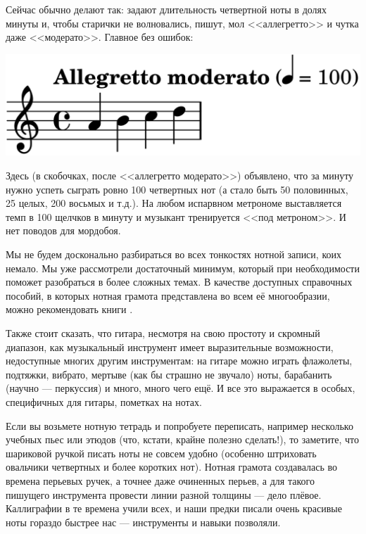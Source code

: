 Сейчас обычно делают так: задают длительность четвертной ноты в долях минуты и, чтобы старички не волновались, пишут, мол <<аллегретто>> и чутка даже <<модерато>>. Главное без ошибок:
\begin{center}
    \includegraphics{fig/notes/tempo}
\end{center}

Здесь (в скобочках, после <<аллегретто модерато>>) объявлено, что за минуту нужно успеть сыграть ровно 100 четвертных нот (а стало быть 50 половинных, 25 целых, 200 восьмых и т.д.). На любом испарвном метрономе выставляется темп в 100 щелчков в минуту и музыкант тренируется <<под метроном>>. И нет поводов для мордобоя. 

Мы не будем досконально разбираться во всех тонкостях нотной записи, коих немало. Мы уже рассмотрели достаточный минимум, который при необходимости поможет разобраться в более сложных темах. В качестве доступных справочных пособий, в которых нотная грамота представлена во всем её многообразии, можно рекомендовать книги \cite{bib:alekseev:MusicTheory,bib:vahromeev:Theory}.

Также стоит сказать, что гитара, несмотря на свою простоту и скромный диапазон, как музыкальный инструмент имеет выразительные возможности, недоступные многих другим инструментам: на гитаре можно играть флажолеты, подтяжки, вибрато, мертыве (как бы страшно не звучало) ноты, барабанить (научно --- перкуссия) и много, много чего ещё. И все это выражается в особых, специфичных для гитары, пометках на нотах. 

Если вы возьмете нотную тетрадь и попробуете переписать, например несколько учебных пьес или этюдов (что, кстати, крайне полезно сделать!), то заметите, что шариковой ручкой писать ноты не совсем удобно (особенно штриховать овальчики четвертных и более коротких нот). Нотная грамота создавалась во времена перьевых ручек, а точнее даже очиненных перьев, а для такого пишущего инструмента провести линии разной толщины --- дело плёвое. Каллиграфии в те времена учили всех, и наши предки писали очень красивые ноты гораздо быстрее нас --- инструменты и навыки позволяли.

